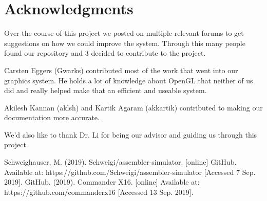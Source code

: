\documentclass[conference]{IEEEtran}
\begin{document}
\section{Acknowledgments}
Over the course of this project we posted on multiple relevant forums to get suggestions on how we could improve the system. Through this many people found our repository and 3 decided to contribute to the project.

Carsten Eggers (Gwarks) contributed most of the work that went into our graphics system. He holds a lot of knowledge about OpenGL that neither of us did and really helped make that an efficient and useable system.

Akilesh Kannan (aklsh) and Kartik Agaram (akkartik) contributed to making our documentation more accurate.

We'd also like to thank Dr. Li for being our advisor and guiding us through this project. 

\begin{thebibliography}{00}
 Schweighauser, M. (2019). Schweigi/assembler-simulator. [online] GitHub. Available at: https://github.com/Schweigi/assembler-simulator [Accessed 7 Sep. 2019].
GitHub. (2019). Commander X16. [online] Available at: https://github.com/commanderx16 [Accessed 13 Sep. 2019].
\end{thebibliography}
\end{document}
